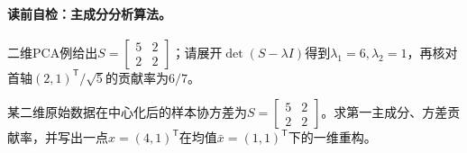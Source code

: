 \paragraph{读前自检：主成分分析算法。}二维PCA例给出$S=\begin{bmatrix}5&2\\2&2\end{bmatrix}$；请展开$\det(S-\lambda I)$得到$\lambda_1=6,\lambda_2=1$，再核对首轴$(2,1)^{\mathsf T}/\sqrt5$的贡献率为$6/7$。\par

\label{struct:V4-C04-CH32}
\begin{example}[二维PCA投影与重构]\label{exm:V4-C04-pca-projection}
某二维原始数据在中心化后的样本协方差为$S=\begin{bmatrix}5&2\\2&2\end{bmatrix}$。求第一主成分、方差贡献率，并写出一点$x=(4,1)^{\mathsf T}$在均值$\bar x=(1,1)^{\mathsf T}$下的一维重构。

\label{struct:V4-C04-CH33}
\end{example}
